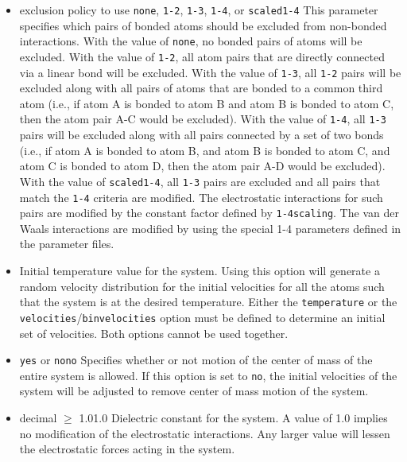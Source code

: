 \begin{itemize}
\item
{}%
{exclusion policy to use}%
{\verb!none!, \verb!1-2!, \verb!1-3!, \verb!1-4!, or \verb!scaled1-4!}%
{\label{param:exclude}
This parameter specifies which pairs of bonded atoms should
be excluded from non-bonded
interactions.  With the value of \verb!none!, no bonded pairs of atoms 
will be excluded.  With the value of \verb!1-2!, all atom pairs that
are directly connected via a linear bond will be excluded.  With the
value of \verb!1-3!, all \verb!1-2! pairs will be excluded along with
all pairs of atoms that are bonded to a common
third atom (i.e., if atom A is bonded to atom B and atom B is bonded
to atom C, then the atom pair A-C would be excluded).
With the value of \verb!1-4!, all \verb!1-3! pairs will be excluded along
with all pairs connected by a set of two bonds (i.e., if atom A is bonded
to atom B, and atom B is bonded to atom C, and atom C is bonded to
atom D, then the atom pair A-D would be excluded).  With the value
of \verb!scaled1-4!, all \verb!1-3! pairs are excluded and all pairs
that match the \verb!1-4! criteria are modified.  The electrostatic
interactions for such pairs are modified by the constant factor
defined by \verb!1-4scaling!.  
The van der Waals interactions are modified
by using the special 1-4 parameters defined in the parameter files.}

\item
{}
{\label{param:temperature}
Initial temperature value for the system.  
Using this option will generate a random
velocity distribution for the initial velocities 
for all the atoms such that the system 
is at the desired temperature.  
Either the \verb!temperature! 
or the \verb!velocities!/\verb!binvelocities!
option must be defined to determine an initial set of velocities.  
Both options cannot be used together.}

\item
{}%
{\verb!yes! or \verb!no!}{\verb!no!}
{
Specifies whether or not motion of 
the center of mass of the entire system is allowed.  
If this option is set to \verb!no!, the initial velocities of the system 
will be adjusted to remove center of mass motion of the system.}

\item
{}%
{decimal $\geq$ 1.0}{1.0}
{Dielectric constant for the system.  A value of 1.0 implies no modification
of the electrostatic interactions.  Any larger value will lessen the
electrostatic forces acting in the system.}


\end{itemize}
